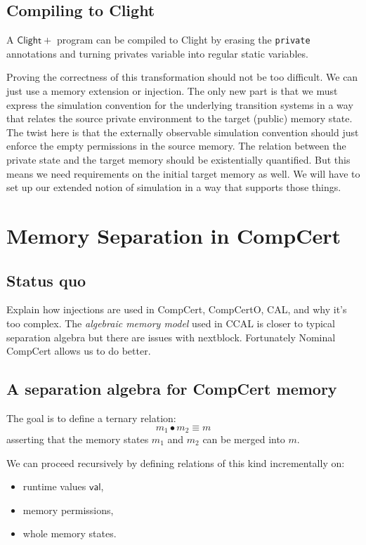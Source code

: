 \documentclass[acmsmall,screen,review,anonymous]{acmart}
\newcommand{\ClightP}{\ensuremath{\mathsf{Clight+}}}
\begin{document}
\subsection{Compiling to Clight}

A \ClightP{} program can be compiled to Clight
by erasing the \texttt{private} annotations
and turning privates variable into regular
static variables.

Proving the correctness of this transformation
should not be too difficult.
We can just use a memory extension or injection.
The only new part is that we must express
the simulation convention for the underlying transition systems
in a way that relates the source private environment
to the target (public) memory state.
The twist here is that
the externally observable simulation convention
should just enforce the empty permissions in the source memory.
The relation between the private state and the target memory
should be existentially quantified.
But this means we need requirements on the initial target memory as well.
We will have to set up our extended notion of simulation
in a way that supports those things.


\section{Memory Separation in CompCert} %

\subsection{Status quo} %

Explain how injections are used in CompCert, CompCertO, CAL,
and why it's too complex.
The \emph{algebraic memory model} used in CCAL
is closer to typical separation algebra
but there are issues with nextblock.
Fortunately Nominal CompCert allows us to
do better.


\subsection{A separation algebra for CompCert memory} %

The goal is to define a ternary relation:
\[
    m_1 \bullet m_2 \equiv m
\]
asserting that the memory states $m_1$ and $m_2$
can be merged into $m$.

We can proceed recursively by defining
relations of this kind incrementally on:
\begin{itemize}
  \item runtime values $\mathsf{val}$,
  \item memory permissions,
  \item whole memory states.
\end{itemize}
\end{document}
